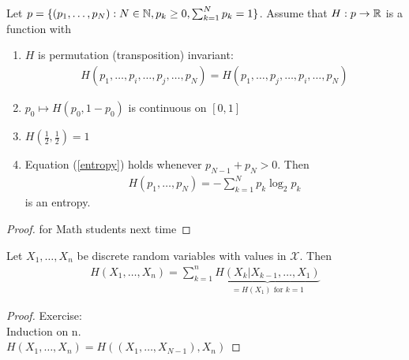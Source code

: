 \documentclass[mfit.tex]{subfiles}
\begin{document}
\begin{theorem}
  Let $p = \{(p_1,\dots,p_N): N \in \mathbb{N}, p_k \geq 0, \sum_{k=1}^N p_k = 1 \}$.
  Assume that $H: p \to \mathbb{R}$ is a function with
  \begin{enumerate}%
    \item $H$ is permutation (transposition) invariant:
    \begin{align*}
      H(p_1,\dots,p_i,\dots,p_j,\dots,p_N) = H(p_1,\dots,p_j,\dots,p_i,\dots,p_N)
    \end{align*}
    \item $p_0 \mapsto H(p_0,1-p_0)$ is continuous on $[0,1]$
    \item $H(\frac{1}{2},\frac{1}{2}) = 1$
    \item Equation (\ref{entropy}) holds whenever $p_{N-1} + p_N > 0$.
    Then
    \begin{align*}
      H(p_1,\dots,p_N) = - \sum_{k=1}^N p_k \log_2 p_k
    \end{align*}
    is an entropy.
  \end{enumerate}
\end{theorem}

\begin{proof}
  for Math students next time
\end{proof}

\begin{theorem}
  Let $X_1,\dots,X_n$ be discrete random variables with values in $\mathcal{X}$.
  Then
  \begin{align*}
    H(X_1,\dots,X_n) = \sum_{k=1}^n \underbrace{H(X_k| X_{k-1},\dots,X_1)}_{= H(X_1) \text{ for } k=1}
  \end{align*}
\end{theorem}

\begin{proof}
  Exercise:\\
  Induction on n.\\
  $H(X_1,\dots,X_n) = H((X_1,\dots,X_{N-1}),X_n)$ 
\end{proof}
\end{document}
